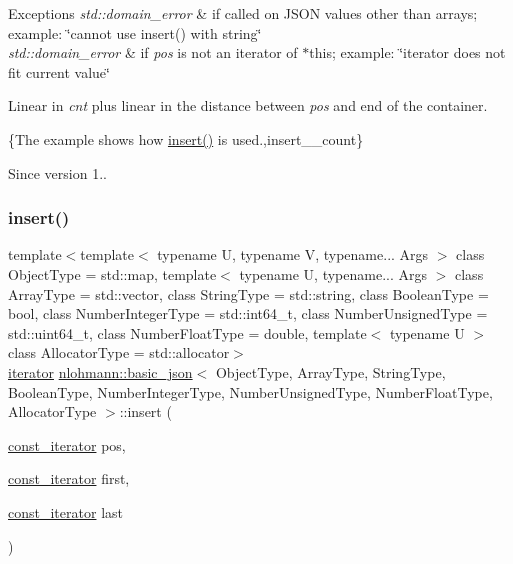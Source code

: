 \begin{DoxyExceptions}{Exceptions}
{\em std\+::domain\+\_\+error} & if called on J\+S\+ON values other than arrays; example\+: {\ttfamily \char`\"{}cannot use insert() with string\char`\"{}} \\
\hline
{\em std\+::domain\+\_\+error} & if {\itshape pos} is not an iterator of $\ast$this; example\+: {\ttfamily \char`\"{}iterator does not fit current value\char`\"{}}\\
\hline
\end{DoxyExceptions}
Linear in {\itshape cnt} plus linear in the distance between {\itshape pos} and end of the container.

\{The example shows how {\ttfamily \hyperlink{classnlohmann_1_1basic__json_a7f7bbb3a9efef2e2442f538a24c1c47b}{insert()}} is used.,insert\+\_\+\+\_\+count\}

\begin{DoxySince}{Since}
version 1.. 
\end{DoxySince}
\hypertarget{classnlohmann_1_1basic__json_aeaa0644fd6b99af364e772092268dfd6}{}\label{classnlohmann_1_1basic__json_aeaa0644fd6b99af364e772092268dfd6} 
\subsubsection{\texorpdfstring{insert()}{insert()}\hspace{0.1cm}{\footnotesize\ttfamily [4/5]}}
{\footnotesize\ttfamily template$<$template$<$ typename U, typename V, typename... Args $>$ class Object\+Type = std\+::map, template$<$ typename U, typename... Args $>$ class Array\+Type = std\+::vector, class String\+Type  = std\+::string, class Boolean\+Type  = bool, class Number\+Integer\+Type  = std\+::int64\+\_\+t, class Number\+Unsigned\+Type  = std\+::uint64\+\_\+t, class Number\+Float\+Type  = double, template$<$ typename U $>$ class Allocator\+Type = std\+::allocator$>$ \\
\hyperlink{classnlohmann_1_1basic__json_1_1iterator}{iterator} \hyperlink{classnlohmann_1_1basic__json}{nlohmann\+::basic\+\_\+json}$<$ Object\+Type, Array\+Type, String\+Type, Boolean\+Type, Number\+Integer\+Type, Number\+Unsigned\+Type, Number\+Float\+Type, Allocator\+Type $>$\+::insert (\begin{DoxyParamCaption}\item[{\hyperlink{classnlohmann_1_1basic__json_1_1const__iterator}{const\+\_\+iterator}}]{pos,  }\item[{\hyperlink{classnlohmann_1_1basic__json_1_1const__iterator}{const\+\_\+iterator}}]{first,  }\item[{\hyperlink{classnlohmann_1_1basic__json_1_1const__iterator}{const\+\_\+iterator}}]{last }\end{DoxyParamCaption})\hspace{0.3cm}{\ttfamily [inline]}}



